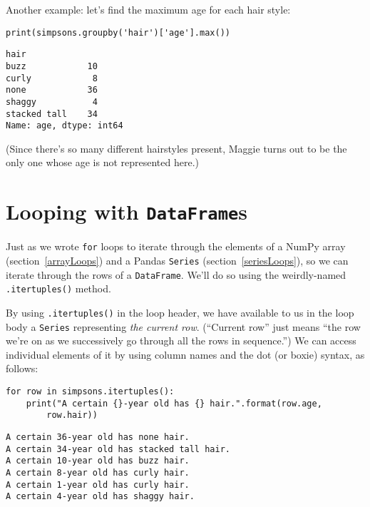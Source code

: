 Another example: let's find the maximum age for each hair style:

\begin{Verbatim}[fontsize=\small,samepage=true,frame=single,framesep=3mm]
print(simpsons.groupby('hair')['age'].max())
\end{Verbatim}
\vspace{-.2in}

\begin{Verbatim}[fontsize=\small,samepage=true,frame=leftline,framesep=5mm,framerule=1mm]
hair
buzz            10
curly            8
none            36
shaggy           4
stacked tall    34
Name: age, dtype: int64
\end{Verbatim}

(Since there's so many different hairstyles present, Maggie turns out to be the
only one whose age is not represented here.)


\section{Looping with \texttt{DataFrame}s}


Just as we wrote \texttt{for} loops to iterate through the elements of a NumPy
array (section~\ref{arrayLoops}) and a Pandas \texttt{Series}
(section~\ref{seriesLoops}), so we can iterate through the rows of a
\texttt{DataFrame}. We'll do so using the weirdly-named \texttt{.itertuples()}
method.

By using \texttt{.itertuples()} in the loop header, we have available to us in
the loop body a \texttt{Series} representing \textit{the current row}.
(``Current row'' just means ``the row we're on as we successively go through
all the rows in sequence.'') We can access individual elements of it by using
column names and the dot (or boxie) syntax, as follows:

\begin{Verbatim}[fontsize=\footnotesize,samepage=true,frame=single,framesep=3mm]
for row in simpsons.itertuples():
    print("A certain {}-year old has {} hair.".format(row.age,
        row.hair))
\end{Verbatim}
\vspace{-.2in}

\begin{Verbatim}[fontsize=\small,samepage=true,frame=leftline,framesep=5mm,framerule=1mm]
A certain 36-year old has none hair.
A certain 34-year old has stacked tall hair.
A certain 10-year old has buzz hair.
A certain 8-year old has curly hair.
A certain 1-year old has curly hair.
A certain 4-year old has shaggy hair.
\end{Verbatim}

